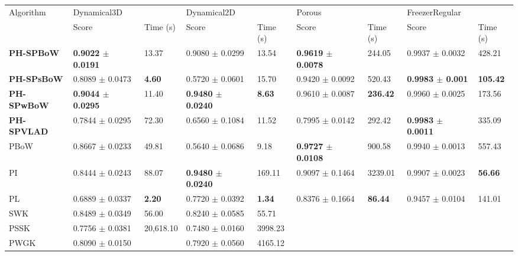 \documentclass[5GeSdc,ASOC,numref,printGA,printHL,CASflow,nocrossmark,longtitle,PROOF]{/usr/local/texlive/iTemplates/01-Templates/01-Els-Jnl/01-Standard_Templates/V1/ELS_MDL5-V1-6}
\begin{document}
\begin{articlestyle}
\begin{table}[!tb]
{\begin{tabular*}{465pt}{@{\extracolsep\fill}@{\hskip6pt}lllllllll@{\hskip6pt}}
\midrule
Algorithm & \multicolumn{2}{l}{Dynamical3D} & \multicolumn{2}{l}{Dynamical2D} & \multicolumn{2}{l}{Porous} & \multicolumn{2}{l}{FreezerRegular} \\
\cmidrule(l{6pt}r{6pt}){2-3} \cmidrule(l{6pt}r{6pt}){4-5} \cmidrule(l{6pt}r{6pt}){6-7} \cmidrule(l{6pt}){8-9}  & Score & Time (s) & Score & Time (s) & Score & Time (s) & Score & Time (s)\\
\colrule
\textbf{PH-SPBoW} & \textbf{0.9022 $\pm$ 0.0191} & 13.37 & 0.9080  $\pm$ 0.0299 & 13.54 & \textbf{0.9619 $\pm$ 0.0078} & 244.05 & 0.9937 $\pm$ 0.0032 & 428.21\\
\textbf{PH-SPsBoW} & 0.8089 $\pm$ 0.0473 & \textbf{4.60} & 0.5720 $\pm$ 0.0601 & 15.70 & 0.9420 $\pm$ 0.0092 & 520.43 & \textbf{0.9983 $\pm$ 0.001} & \textbf{105.42}\\
\textbf{PH-SPwBoW} & \textbf{0.9044 $\pm$ 0.0295} & 11.40 & \textbf{0.9480 $\pm$ 0.0240} & \textbf{8.63} & 0.9610 $\pm$ 0.0087 & \textbf{236.42} & 0.9960 $\pm$ 0.0025 & 173.56\\
\textbf{PH-SPVLAD} & 0.7844 $\pm$ 0.0295 & 72.30 & 0.6560 $\pm$ 0.1084 & 11.52 & 0.7995 $\pm$ 0.0142 & 292.42 & \textbf{0.9983 $\pm$ 0.0011} & 335.09\\
PBoW & 0.8667 $\pm$ 0.0233 & 49.81 & 0.5640 $\pm$ 0.0686 & 9.18 & \textbf{0.9727 $\pm$ 0.0108} & 900.58 & 0.9940 $\pm$ 0.0013 & 557.43\\
PI & 0.8444 $\pm$ 0.0243 & 88.07  &\textbf{0.9480 $\pm$ 0.0240} & 169.11 & 0.9097 $\pm$ 0.1464 & 3239.01 & 0.9907 $\pm$ 0.0023 & \textbf{56.66}\\
PL & 0.6889 $\pm$ 0.0337 & \textbf{2.20} & 0.7720 $\pm$ 0.0392 & \textbf{1.34} & 0.8376 $\pm$ 0.1664 & \textbf{86.44} & 0.9457 $\pm$ 0.0104 & 141.01\\
SWK & 0.8489 $\pm$ 0.0349 & 56.00 & 0.8240 $\pm$ 0.0585 & 55.71 & & & &\\
PSSK & 0.7756 $\pm$ 0.0381 & 20,618.10 & 0.7480 $\pm$ 0.0160 & 3998.23 & & & &\\
PWGK & 0.8090 $\pm$ 0.0150 & & 0.7920 $\pm$ 0.0560 & 4165.12 & & & &\\
\bottomrule
\end{tabular*}}  
{}	
\end{table}



\end{articlestyle}
\end{document}
